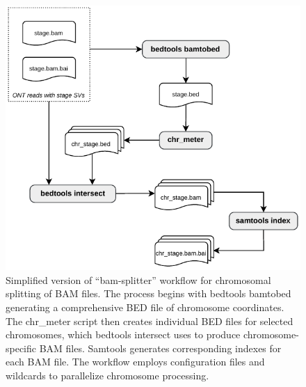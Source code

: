 \begin{figure}[H]
    \centering
    \includegraphics[scale=1.3]{img/bam-splitter.pdf}
    \caption[Simplified version of ``bam-splitter'' workflow for chromosomal 
    splitting of BAM files]{Simplified version of ``bam-splitter'' workflow for 
    chromosomal splitting of BAM files. The process begins with bedtools 
    bamtobed generating a comprehensive BED file of chromosome coordinates. 
    The chr\_meter script then creates individual BED files for selected 
    chromosomes, which bedtools intersect uses to produce chromosome-specific 
    BAM files. Samtools generates corresponding indexes for each BAM file. The 
    workflow employs configuration files and wildcards to parallelize chromosome 
    processing.}
    \label{fig:bam-splitter}
\end{figure}


